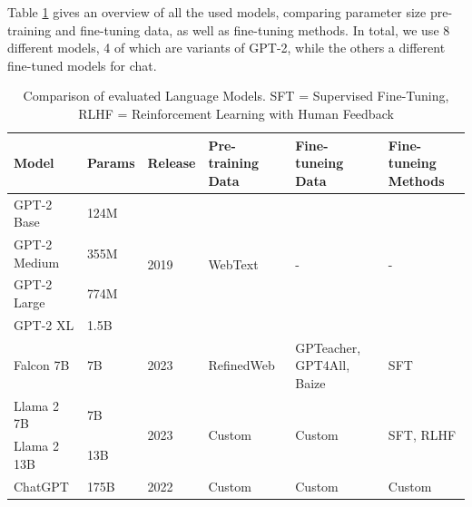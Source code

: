 Table \ref{tab:language-models} gives an overview of all the used models, comparing parameter size pre-training and fine-tuning data, as well as fine-tuning methods.
In total, we use 8 different models, 4 of which are variants of GPT-2, while the others a different fine-tuned models for chat.
\begin{table}[tb]
\centering
\begin{tabularx}{\textwidth}{lllXXX}
\hline
\textbf{Model} & \textbf{Params} & \textbf{Release} & \textbf{Pre-training Data} & \textbf{Fine-tuneing Data} & \textbf{Fine-tuneing Methods} \\
\hline
GPT-2 Base    & 124M & \multirow{4}{*}{2019} & \multirow{4}{*}{WebText} & \multirow{4}{*}{-} & \multirow{4}{*}{-} \\
GPT-2 Medium  & 355M &                      &                          &  &  \\
GPT-2 Large   & 774M &                      &                          &  &  \\
GPT-2 XL      & 1.5B &                      &                          &  &  \\
\hline
Falcon 7B              & 7B      & 2023 & RefinedWeb           & GPTeacher, GPT4All, Baize & SFT \\
\hline
Llama 2 7B & 7B    & \multirow{2}{*}{2023} & \multirow{2}{*}{Custom} & \multirow{2}{*}{Custom} & \multirow{2}{*}{SFT, RLHF} \\
Llama 2 13B   & 13B   &  &                        &                         &  \\
\hline
ChatGPT                & 175B   & 2022 & Custom                & Custom & Custom \\
\hline
\end{tabularx}
\caption{Comparison of evaluated Language Models. SFT = Supervised Fine-Tuning, RLHF = Reinforcement Learning with Human Feedback}\label{tab:language-models}
\end{table}

